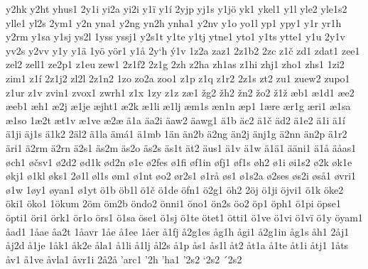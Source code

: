 y2hk
y2ht
yhus1
2y1i
yi2a
yi2i
y1ï
y1í
2yjp
yj1s
y1jö
yk1
ykel1
y1l
yle2
yle1s2
ylle1
yl2s
2ym1
y2n
yna1
y2ng
yn2h
ynha1
y2nv
y1o
yo1l
yp1
ypy1
y1r
yr1h
y2rm
y1sa
y1sj
ys2l
1yss
yssj1
y2s1t
y1te
y1tj
ytne1
yto1
y1ts
ytte1
y1u
2y1v
yv2s
y2vv
y1y
y1ä
1yö
yör1
y1å
2y`h
ý1v
1z2a
zaz1
2z1b2
2zc
z1č
zd1
zdat1
zee1
zel2
zell1
ze2p1
z1eu
zew1
2z1f2
2z1g
2zh
z2ha
zh1as
z1hi
zhj1
zho1
zhs1
1zi2
zim1
z1í
2z1j2
zl2l
2z1n2
1zo
zo2a
zoo1
z1p
z1q
z1r2
2z1s
zt2
zu1
zuew2
zupo1
z1ur
z1v
zvin1
zvox1
zwrh1
z1x
1zy
z1z
zæ1
žg2
žh2
žn2
žo2
ž1ž
æb1
æ1d1
æe2
æeb1
æh1
æ2j
æ1je
æjht1
æ2k
æ1li
æ1lj
æm1s
æn1n
æp1
1ære
ær1g
æri1
æ1sa
æ1so
1æ2t
æt1v
æ1ve
æ2æ
ä1a
äa2i
äaw2
äawg1
ä1b
äc2
ä1č
äd2
ä1e2
ä1i
ä1í
ä1ji
äj1s
ä1k2
2äl2
ä1la
ämá1
ä1mb
1än
än2b
ä2ng
än2j
änj1g
ä2nn
än2p
ä1r2
äri1
ä2rm
ä2rn
ä2s1
äs2m
äs2o
äs2s
äs1t
ät2
äus1
ä1v
ä1w
ä1ä1
ääni1
ä1å
äåas1
øch1
øčsv1
ø2d2
ød1k
ød2n
ø1e
ø2fes
ø1fi
øf1in
øfj1
øf1s
øh2
ø1i
øi1s2
ø2k
øk1e
økj1
ø1kl
øks1
2ø1l
øl1s
øm1
ø1nt
øo2
ør2s1
ø1rå
øs1
ø1s2a
ø2ses
øs2i
øså1
øvri1
ø1w
1øy1
øyan1
ø1yt
ö1b
öb1l
ö1č
ö1de
öfn1
ö2g1
öh2
2öj
ö1ji
öjvi1
ö1k
öke2
öki1
öko1
1ökum
2öm
öm2b
öndo2
önni1
öno1
ön2s
öo2
öp1
öph1
ö1pi
öpse1
öpti1
öri1
örk1
ör1o
örs1
ö1sa
öse1
ö1sj
ö1te
ötet1
ötti1
ö1ve
ö1vi
ö1vï
ö1y
öyam1
åad1
1åae
åa2t
1åavr
1åe
å1ee
1åer
å1fj
å2g1es
åg1h
ågi1
å2g1in
åg1s
åh1
2åj1
åj2d
å1je
1åk1
åk2e
åla1
å1li
å1lj
ål2s
å1p
ås1
ås1l
åt2
åt1a
å1te
åt1i
åtj1
1åts
åv1
å1ve
åvla1
åvr1i
2å2å
'arc1
'2h
'ha1
'2s2
`2s2
´2s2
